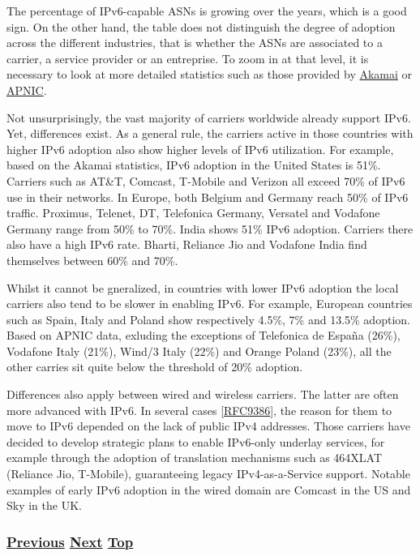 \documentclass[
]{article}
\begin{document}
The percentage of IPv6-capable ASNs is growing over the years, which is
a good sign. On the other hand, the table does not distinguish the
degree of adoption across the different industries, that is whether the
ASNs are associated to a carrier, a service provider or an entreprise.
To zoom in at that level, it is necessary to look at more detailed
statistics such as those provided by
\href{https://www.akamai.com/internet-station/cyber-attacks/state-of-the-internet-report/ipv6-adoption-visualization}{Akamai}
or \href{https://stats.labs.apnic.net}{APNIC}.

Not unsurprisingly, the vast majority of carriers worldwide already
support IPv6. Yet, differences exist. As a general rule, the carriers
active in those countries with higher IPv6 adoption also show higher
levels of IPv6 utilization. For example, based on the Akamai statistics,
IPv6 adoption in the United States is 51\%. Carriers such as AT\&T,
Comcast, T-Mobile and Verizon all exceed 70\% of IPv6 use in their
networks. In Europe, both Belgium and Germany reach 50\% of IPv6
traffic. Proximus, Telenet, DT, Telefonica Germany, Versatel and
Vodafone Germany range from 50\% to 70\%. India shows 51\% IPv6
adoption. Carriers there also have a high IPv6 rate. Bharti, Reliance
Jio and Vodafone India find themselves between 60\% and 70\%.

Whilst it cannot be gneralized, in countries with lower IPv6 adoption
the local carriers also tend to be slower in enabling IPv6. For example,
European countries such as Spain, Italy and Poland show respectively
4.5\%, 7\% and 13.5\% adoption. Based on APNIC data, exluding the
exceptions of Telefonica de España (26\%), Vodafone Italy (21\%), Wind/3
Italy (22\%) and Orange Poland (23\%), all the other carries sit quite
below the threshold of 20\% adoption.

Differences also apply between wired and wireless carriers. The latter
are often more advanced with IPv6. In several cases
{[}\href{https://www.rfc-editor.org/info/rfc9386}{RFC9386}{]}, the
reason for them to move to IPv6 depended on the lack of public IPv4
addresses. Those carriers have decided to develop strategic plans to
enable IPv6-only underlay services, for example through the adoption of
translation mechanisms such as 464XLAT (Reliance Jio, T-Mobile),
guaranteeing legacy IPv4-as-a-Service support. Notable examples of early
IPv6 adoption in the wired domain are Comcast in the US and Sky in the
UK.

\subsubsection{\texorpdfstring{\hyperref[status]{Previous}
\hyperref[deployment-in-the-home]{Next}
\hyperref[deployment-status]{Top}}{Previous Next Top}}\label{previous-next-top-36}
\end{document}
